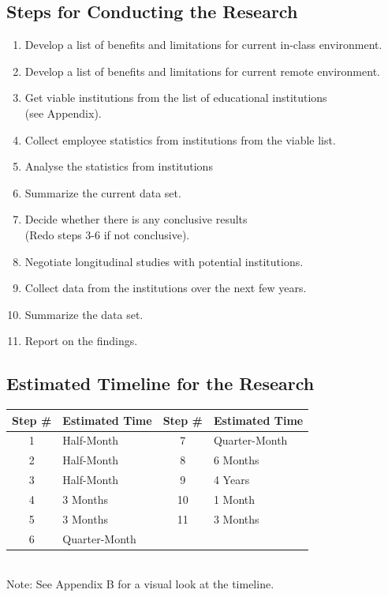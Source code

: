 \documentclass[titlepage]{article}
\begin{document}
\subsection{Steps for Conducting the Research}
\begin{enumerate}
	\item Develop a list of benefits and limitations for current in-class environment.
	\item Develop a list of benefits and limitations for current remote environment.
	\item Get viable institutions from the  list of educational institutions \\(see Appendix).
	\item Collect employee statistics from institutions from the viable list.
	\item Analyse the statistics from institutions
	\item Summarize the current data set.
	\item Decide whether there is any conclusive results \\
		  (Redo steps 3-6 if not conclusive).
	\item Negotiate longitudinal studies with potential institutions.
	\item Collect data from the institutions over the next few years.
	\item Summarize the data set.
	\item Report on the findings.
\end{enumerate}

\subsection{Estimated Timeline for the Research}

\begin{center}
\begin{tabular}{|c|l|c|l|}
\hline
Step \# & Estimated Time & Step \# & Estimated Time \\
\hline
1 & Half-Month & 7 & Quarter-Month \\
\hline
2 & Half-Month & 8 & 6 Months \\
\hline
3 & Half-Month & 9 & 4 Years \\
\hline
4 & 3 Months & 10 & 1 Month \\
\hline
5 & 3 Months & 11 & 3 Months \\
\hline
6 & Quarter-Month &  &  \\
\hline
\end{tabular}
\\
Note: See Appendix B for a visual look at the timeline.

\end{center}
\end{document}
